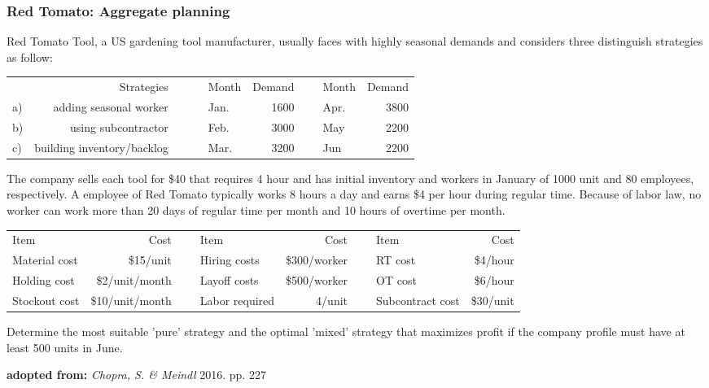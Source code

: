 \documentclass[10pt,handout,notes=show]{beamer}
\begin{document}
\begin{frame}
  \frametitle{Red Tomato: Aggregate planning}

  \small{
    Red Tomato Tool, a US gardening tool manufacturer, usually faces with highly seasonal demands and considers three distinguish strategies as follow: \\
    \begin{center} \scriptsize{
    \begin{tabular}{lrclrclr} \cline{1-2} \cline{4-8}
        & Strategies              &~~~ & Month & Demand &~& Month & Demand   \\ \cline{1-2} \cline{4-8}
      a)& adding seasonal worker  &    &Jan.  & 1600    & & Apr.  & 3800    \\
      b)& using subcontractor     &    &Feb.  & 3000    & & May   & 2200   \\
      c)& building inventory/backlog&  &Mar.  & 3200    & & Jun   & 2200   \\  \cline{1-2} \cline{4-8}
    \end{tabular} }
    \end{center}

    The company sells each tool for \$40 that requires 4 hour and has initial inventory and workers in January of 1000 unit and 80 employees, respectively. A employee of Red Tomato typically works 8 hours a day and earns \$4 per hour during regular time.  Because of labor law, no worker can work more than 20 days of regular time per month and 10 hours of overtime per month.

    \begin{center} \scriptsize{
    \begin{tabular}{lrclrclr} \cline{1-2} \cline{4-5} \cline{7-8}
      Item          & Cost          & ~ & Item        & Cost         & ~ & Item              & Cost\\ \cline{1-2} \cline{4-5} \cline{7-8}
      Material cost & \$15/unit     &   & Hiring costs& \$300/worker &   & RT cost & \$4/hour \\
      Holding cost  & \$2/unit/month&   & Layoff costs& \$500/worker &   & OT cost& \$6/hour \\
      Stockout cost & \$10/unit/month&   & Labor required& 4/unit     &   & Subcontract cost& \$30/unit \\ \cline{1-2} \cline{4-5} \cline{7-8}
    \end{tabular} }
    \end{center}
    Determine the most suitable 'pure' strategy and the optimal 'mixed' strategy that maximizes profit if the company profile must have at least 500 units in June.
  }
  \begin{flushright}
    \tiny{\textbf{adopted from:}  \textsl{Chopra, S. \& Meindl} 2016. pp. 227 }
  \end{flushright}


\end{frame}
\end{document}
